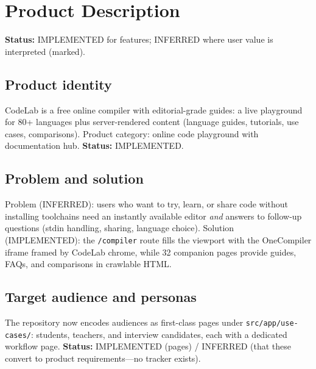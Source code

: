 \section{Product Description}
\label{sec:project-description}

\textbf{Status:} IMPLEMENTED for features; INFERRED where user value is interpreted (marked).

\subsection{Product identity}
CodeLab is a free online compiler with editorial-grade guides: a live playground for 80+ languages plus server-rendered content (language guides, tutorials, use cases, comparisons). Product category: online code playground with documentation hub. \textbf{Status:} IMPLEMENTED.

\subsection{Problem and solution}
Problem (INFERRED): users who want to try, learn, or share code without installing toolchains need an instantly available editor \textit{and} answers to follow-up questions (stdin handling, sharing, language choice). Solution (IMPLEMENTED): the \texttt{/compiler} route fills the viewport with the OneCompiler iframe framed by CodeLab chrome, while 32 companion pages provide guides, FAQs, and comparisons in crawlable HTML.

\subsection{Target audience and personas}
The repository now encodes audiences as first-class pages under \texttt{src/app/use-cases/}: students, teachers, and interview candidates, each with a dedicated workflow page. \textbf{Status:} IMPLEMENTED (pages) / INFERRED (that these convert to product requirements---no tracker exists).

